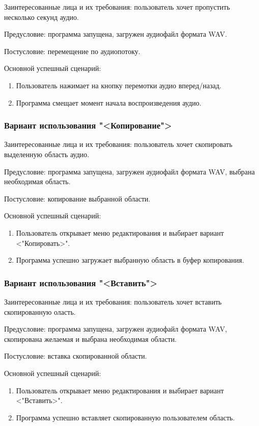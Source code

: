 Заинтересованные лица и их требования: пользователь хочет пропустить несколько секунд аудио.

Предусловие: программа запущена, загружен аудиофайл формата WAV.

Постусловие: перемещение по аудиопотоку.

Основной успешный сценарий:
\begin{enumerate}
	\item Пользователь нажимает на кнопку перемотки аудио вперед/назад.
	\item Программа смещает момент начала воспроизведения аудио.
\end{enumerate} 

\subsubsection{Вариант использования "<Копирование">}

Заинтересованные лица и их требования: пользователь хочет скопировать выделенную область аудио.

Предусловие: программа запущена, загружен аудиофайл формата WAV, выбрана необходимая область.

Постусловие: копирование выбранной области.

Основной успешный сценарий:
\begin{enumerate}
	\item Пользователь открывает меню редактирования и выбирает вариант <"Копировать>".
	\item Программа успешно загружает выбранную область в буфер копирования.
\end{enumerate} 

\subsubsection{Вариант использования "<Вставить">}

Заинтересованные лица и их требования: пользователь хочет вставить скопированную оласть.

Предусловие: программа запущена, загружен аудиофайл формата WAV, скопирована желаемая и выбрана необходимая области.

Постусловие: вставка скопированной области.

Основной успешный сценарий:
\begin{enumerate}
	\item Пользователь открывает меню редактирования и выбирает вариант <"Вставить>".
	\item Программа успешно вставляет скопированную пользователем область.
\end{enumerate} 

